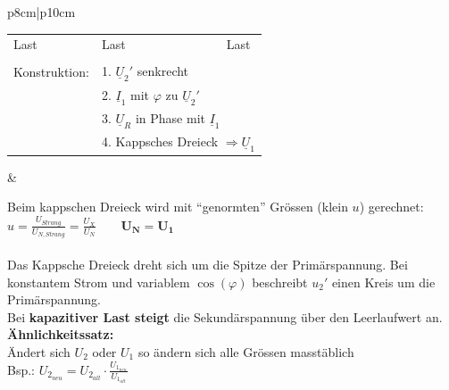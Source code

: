 \begin{tabular}{p{8cm}|p{10cm}}
\begin{minipage}{8cm}
\begin{tabular}[c]{p{2.66cm}p{2.66cm}p{2.66cm}}
                     	Last & Last & Last\\
                     	&&\\
                     	Konstruktion: & 1. $\underline{U}_2'$ senkrecht&\\
                     	& 2. $\underline{I}_1$ mit $\varphi$ zu $\underline{U}_2'$\\
                     	& \multicolumn{2}{l}{3. $\underline{U}_R$ in Phase mit $\underline{I}_1$ }\\
                     	& \multicolumn{2}{l}{4. Kappsches Dreieck $\Rightarrow \underline{U}_1$}
                     \end{tabular}               
                \end{minipage}& \hspace{0.2cm}
				\begin{minipage}{10cm}
		      		Beim kappschen Dreieck wird mit ``genormten'' Gr\"ossen (klein $u$) gerechnet: 
		      		$u = \frac{U_{Strang}}{U_{N, Strang}} = \frac{U_X}{U_N} \qquad
		      		\boldsymbol{U_N = U_1} $\\ \\ Das Kappsche Dreieck dreht sich um die
		      		Spitze der Prim\"arspannung. Bei konstantem Strom und variablem $\cos(\varphi)$ beschreibt ${u}_2'$
		      		einen
		      		Kreis um die Prim\"arspannung.\\ Bei \textbf{kapazitiver Last steigt}
		      		die Sekund\"arspannung über den Leerlaufwert an. \\ 
		      		\textbf{Ähnlichkeitssatz:}\\
		      		\"Andert sich $U_2$ oder $U_1$ so ändern sich alle Gr\"ossen masst\"ablich\\
		      		Bsp.: $\boxed{U_{2_{neu}} = U_{2_{alt}} \cdot \frac{U_{1_{neu}}}{U_{1_{alt}}}}$ \\              
                \end{minipage}     
            \end{tabular}

		
